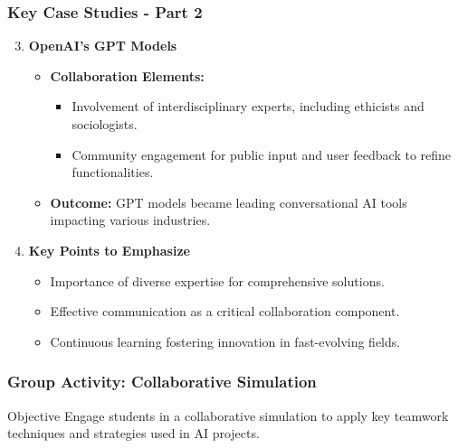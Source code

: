 \documentclass[aspectratio=169]{beamer}
\begin{document}
\begin{frame}[fragile]
    \frametitle{Key Case Studies - Part 2}
    \begin{enumerate}
        \setcounter{enumi}{2} %
        \item \textbf{OpenAI's GPT Models}
            \begin{itemize}
                \item \textbf{Collaboration Elements:}
                    \begin{itemize}
                        \item Involvement of interdisciplinary experts, including ethicists and sociologists.
                        \item Community engagement for public input and user feedback to refine functionalities.
                    \end{itemize}
                \item \textbf{Outcome:} GPT models became leading conversational AI tools impacting various industries.
            \end{itemize}
        \item \textbf{Key Points to Emphasize}
            \begin{itemize}
                \item Importance of diverse expertise for comprehensive solutions.
                \item Effective communication as a critical collaboration component.
                \item Continuous learning fostering innovation in fast-evolving fields.
            \end{itemize}
    \end{enumerate}
\end{frame}

\begin{frame}[fragile]
    \frametitle{Group Activity: Collaborative Simulation}
    \begin{block}{Objective}
        Engage students in a collaborative simulation to apply key teamwork techniques and strategies used in AI projects.
    \end{block}
\end{frame}
\end{document}
